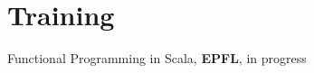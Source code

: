 \documentclass[../cv.tex]{subfiles}
\begin{document}
\hspace{0.2cm}
\begin{minipage}[t]{0.375\linewidth}
	\section{Training}
	Functional Programming in Scala, \textbf{EPFL}, in progress
\end{minipage}
\end{document}

